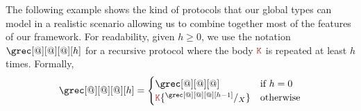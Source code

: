 

The following example shows the kind of protocols that our global
types can model in a realistic scenario allowing us to combine
together most of the features of our framework.
%
For readability, given $h \geq 0$, we use the notation
$\grec[@][@][@][h]$ for a recursive protocol where the body $\aK$ is
repeated at least $h$ times.
%
Formally,
\[
\grec[@][@][@][h] =
\begin{cases}
  \grec[@][@][@] & \text{if } h = 0
  \\
  \aK \sust{X}{\grec[@][@][@][h-1]} & \text{otherwise}
\end{cases}
\]
%

